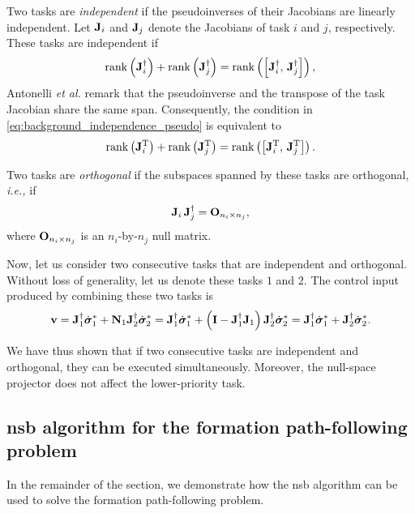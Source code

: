 Two tasks are \emph{independent} if the pseudoinverses of their Jacobians are linearly independent.
Let $\mathbf{J}_i$ and $\mathbf{J}_j$ denote the Jacobians of task $i$ and $j$, respectively.
These tasks are independent if
\begin{equation}
    {\operatorname*{rank}} \left(\mathbf{J}_i^{\dagger}\right) + {\operatorname*{rank}} \left(\mathbf{J}_j^{\dagger}\right) = {\rm rank} \left(\left[ \mathbf{J}_i^{\dagger},\, \mathbf{J}_j^{\dagger} \right]\right),
    \label{eq:background_independence_pseudo}
\end{equation}
Antonelli \emph{et al.} \cite{antonelli_stability_2008} remark that the pseudoinverse and the transpose of the task Jacobian share the same span.
Consequently, the condition in \eqref{eq:background_independence_pseudo} is equivalent to
\begin{equation}
    {\operatorname*{rank}} \left(\mathbf{J}_i^{\mathrm{T}}\right) + {\operatorname*{rank}} \left(\mathbf{J}_j^{\mathrm{T}}\right) = {\rm rank} \left(\left[ \mathbf{J}_i^{\mathrm{T}},\, \mathbf{J}_j^{\mathrm{T}} \right]\right).
    \label{eq:background_independence}
\end{equation}

Two tasks are \emph{orthogonal} if the subspaces spanned by these tasks are orthogonal, \emph{i.e.,} if
\begin{equation}
    \mathbf{J}_i \, \mathbf{J}_j^{\dagger} = \mathbf{O}_{n_i \times n_j},
\end{equation}
where $\mathbf{O}_{n_i \times n_j}$ is an $n_i$-by-$n_j$ null matrix.

Now, let us consider two consecutive tasks that are independent and orthogonal. 
Without loss of generality, let us denote these tasks $1$ and $2$.
The control input produced by combining these two tasks is
\begin{equation}
    \mathbf{v} = \mathbf{J}_1^{\dagger} \dot{\bm{\sigma}}_1^{*} + \mathbf{N}_1 \mathbf{J}_2^{\dagger} \dot{\bm{\sigma}}_2^{*}
    = \mathbf{J}_1^{\dagger} \dot{\bm{\sigma}}_1^{*} + \left(\mathbf{I} - \mathbf{J}_1^{\dagger}\mathbf{J}_1\right) \mathbf{J}_2^{\dagger} \dot{\bm{\sigma}}_2^{*}
    = \mathbf{J}_1^{\dagger} \dot{\bm{\sigma}}_1^{*} + \mathbf{J}_2^{\dagger} \dot{\bm{\sigma}}_2^{*}.
\end{equation}

We have thus shown that if two consecutive tasks are independent and orthogonal, they can be executed simultaneously.
Moreover, the null-space projector does not affect the lower-priority task.

\subsection{\gls{nsb} algorithm for the formation path-following problem}
In the remainder of the section, we demonstrate how the \gls{nsb} algorithm can be used to solve the formation path-following problem.

